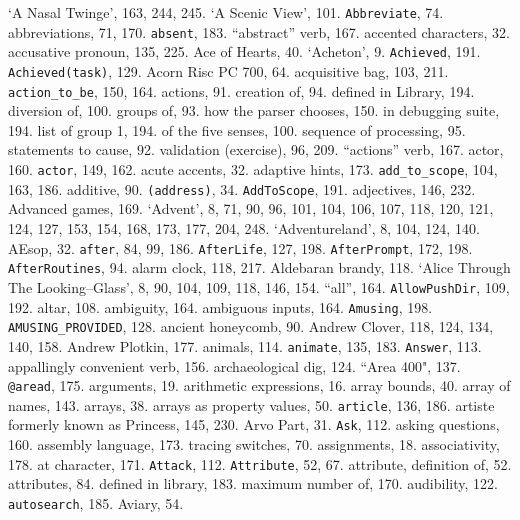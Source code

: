 `A Nasal Twinge', 163, 244, 245.
`A Scenic View', 101.
{{\tt Abbreviate}}, 74.
abbreviations, 71, 170.
{{\tt absent}}, 183.
``abstract'' verb, 167.
accented characters, 32.
accusative pronoun, 135, 225.
Ace of Hearts, 40.
`Acheton', 9.
{{\tt Achieved}}, 191.
{{\tt Achieved(task)}}, 129.
Acorn Risc PC 700, 64.
acquisitive bag, 103, 211.
{{\tt action\_to\_be}}, 150, 164.
actions, 91.
\quad  creation of, 94.
\quad  defined in Library, 194.
\quad  diversion of, 100.
\quad  groups of, 93.
\quad  how the parser chooses, 150.
\quad  in debugging suite, 194.
\quad  list of group 1, 194.
\quad  of the five senses, 100.
\quad  sequence of processing, 95.
\quad  statements to cause, 92.
\quad  validation (exercise), 96, 209.
``actions'' verb, 167.
actor, 160.
{{\tt actor}}, 149, 162.
acute accents, 32.
adaptive hints, 173.
{{\tt add\_to\_scope}}, 104, 163, 186.
additive, 90.
{{\tt (address)}}, 34.
{{\tt AddToScope}}, 191.
adjectives, 146, 232.
Advanced games, 169.
`Advent', 8, 71, 90, 96, 101, 104, 106, 107, 118, 120, 121, 124, 127, 153, 154, 168, 173, 177, 204, 248.
`Adventureland', 8, 104, 124, 140.
AEsop, 32.
{{\tt after}}, 84, 99, 186.
{{\tt AfterLife}}, 127, 198.
{{\tt AfterPrompt}}, 172, 198.
{{\tt AfterRoutines}}, 94.
alarm clock, 118, 217.
Aldebaran brandy, 118.
`Alice Through The Looking\---Glass', 8, 90, 104, 109, 118, 146, 154.
``all'', 164.
{{\tt AllowPushDir}}, 109, 192.
altar, 108.
ambiguity, 164.
ambiguous inputs, 164.
{{\tt Amusing}}, 198.
{{\tt AMUSING\_PROVIDED}}, 128.
ancient honeycomb, 90.
Andrew Clover, 118, 124, 134, 140, 158.
Andrew Plotkin, 177.
animals, 114.
{{\tt animate}}, 135, 183.
{{\tt Answer}}, 113.
appallingly convenient verb, 156.
archaeological dig, 124.
``Area 400", 137.
{{\tt @aread}}, 175.
arguments, 19.
arithmetic expressions, 16.
array bounds, 40.
array of {\fam \ttfam \tentt name}s, 143.
arrays, 38.
arrays as property values, 50.
{{\tt article}}, 136, 186.
artiste formerly known as Princess, 145, 230.
Arvo Part, 31.
{{\tt Ask}}, 112.
asking questions, 160.
assembly language, 173.
\quad  tracing switches, 70.
assignments, 18.
associativity, 178.
at character, 171.
{{\tt Attack}}, 112.
{{\tt Attribute}}, 52, 67.
attribute, definition of, 52.
attributes, 84.
\quad  defined in library, 183.
\quad  maximum number of, 170.
audibility, 122.
{{\tt autosearch}}, 185.
Aviary, 54.

